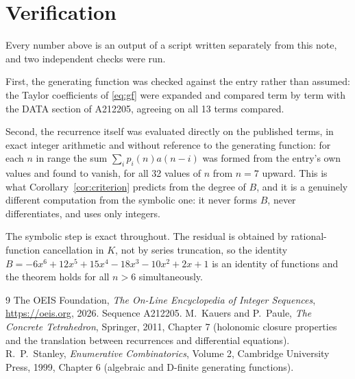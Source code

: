 \documentclass[11pt,a4paper]{article}
\theoremstyle{plain}
\theoremstyle{definition}
\begin{document}
\section{Verification}

Every number above is an output of a script written separately from this note, and two
independent checks were run.

First, the generating function was checked against the entry rather than assumed: the
Taylor coefficients of \eqref{eq:gf} were expanded and compared term by term with the DATA
section of A212205, agreeing on all 13 terms compared.

Second, the recurrence itself was evaluated directly on the published terms, in exact
integer arithmetic and without reference to the generating function: for each $n$ in range
the sum $\sum_{i}p_{i}(n)a(n-i)$ was formed from the entry's own values and found to
vanish, for all 32 values of $n$ from $n=7$ upward. This is what
Corollary~\ref{cor:criterion} predicts from the degree of $B$, and it is a genuinely
different computation from the symbolic one: it never forms $B$, never differentiates, and
uses only integers.

The symbolic step is exact throughout. The residual is obtained by rational-function
cancellation in $K$, not by series truncation, so the identity $B=- 6 x^{6} + 12 x^{5} + 15 x^{4} - 18 x^{3} - 10 x^{2} + 2 x + 1$ is an
identity of functions and the theorem holds for all $n>6$ simultaneously.

\begin{thebibliography}{9}
 The OEIS Foundation, \emph{The On-Line Encyclopedia of Integer Sequences},
\url{https://oeis.org}, 2026. Sequence A212205.
 M.~Kauers and P.~Paule, \emph{The Concrete Tetrahedron}, Springer, 2011,
Chapter 7 (holonomic closure properties and the translation between recurrences and
differential equations).
 R.~P.~Stanley, \emph{Enumerative Combinatorics}, Volume 2, Cambridge
University Press, 1999, Chapter 6 (algebraic and D-finite generating functions).
\end{thebibliography}
\end{document}
